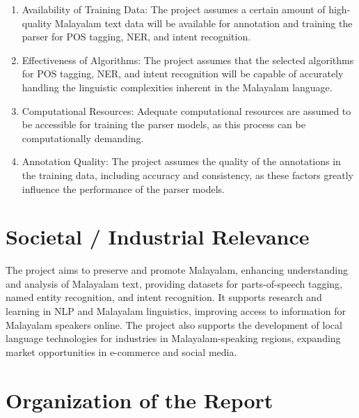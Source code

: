 \documentclass[12pt,a4paper,titlepage]{report}
\begin{document}
	\begin{enumerate}
		\item Availability of Training Data: The project assumes a certain amount of high-quality Malayalam text data will be available for annotation and training the parser for POS tagging, NER, and intent recognition.
		\item Effectiveness of Algorithms: The project assumes that the selected algorithms for POS tagging, NER, and intent recognition will be capable of accurately handling the linguistic complexities inherent in the Malayalam language.
		\item Computational Resources: Adequate computational resources are assumed to be accessible for training the parser models, as this process can be computationally demanding.
		\item Annotation Quality: The project assumes the quality of the annotations in the training data, including accuracy and consistency, as these factors greatly influence the performance of the parser models.
		
	\end{enumerate}
	
	
	\section{Societal / Industrial Relevance}
	
	The project aims to preserve and promote Malayalam, enhancing understanding and analysis of Malayalam text, providing datasets for parts-of-speech tagging, named entity recognition, and intent recognition. It supports research and learning in NLP and Malayalam linguistics, improving access to information for Malayalam speakers online. The project also supports the development of local language technologies for industries in Malayalam-speaking regions, expanding market opportunities in e-commerce and social media.
	
	
	\section{Organization of the Report}
	
\end{document}
